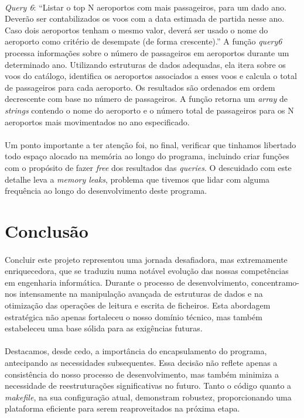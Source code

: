 \documentclass{article}
\begin{document}
\paragraph{}\textit{Query 6}: “Listar o top N aeroportos com mais passageiros, para um dado ano. Deverão ser contabilizados os voos com a data estimada de partida nesse ano. Caso dois aeroportos tenham o mesmo valor, deverá ser usado o nome do aeroporto como critério de desempate (de forma crescente).”
A função \textit{query6} processa informações sobre o número de passageiros em aeroportos durante um determinado ano. Utilizando estruturas de dados adequadas, ela itera sobre os voos do catálogo, identifica os aeroportos associados a esses voos e calcula o total de passageiros para cada aeroporto. Os resultados são ordenados em ordem decrescente com base no número de passageiros. A função retorna um \textit{array} de \textit{strings} contendo o nome do aeroporto e o número total de passageiros para os N aeroportos mais movimentados no ano especificado.
\paragraph{}Um ponto importante a ter atenção foi, no final, verificar que tinhamos libertado todo espaço alocado na memória ao longo do programa, incluindo criar funções com o propósito de fazer \textit{free} dos resultados das \textit{queries}. O descuidado com este detalhe leva a \textit{memory leaks}, problema que tivemos que lidar com alguma frequência ao longo do desenvolvimento deste programa. 
\section{Conclusão}
\paragraph{}Concluir este projeto representou uma jornada desafiadora, mas extremamente enriquecedora, que se traduziu numa notável evolução das nossas competências em engenharia informática. Durante o processo de desenvolvimento, concentramo-nos intensamente na manipulação avançada de estruturas de dados e na otimização das operações de leitura e escrita de ficheiros. Esta abordagem estratégica não apenas fortaleceu o nosso domínio técnico, mas também estabeleceu uma base sólida para as exigências futuras.
\paragraph{}Destacamos, desde cedo, a importância do encapsulamento do programa, antecipando as necessidades subsequentes. Essa decisão não reflete apenas a consistência do nosso processo de desenvolvimento, mas também minimiza a necessidade de reestruturações significativas no futuro. Tanto o código quanto a \textit{makefile}, na sua configuração atual, demonstram robustez, proporcionando uma plataforma eficiente para serem reaproveitados na próxima etapa.
\end{document}
